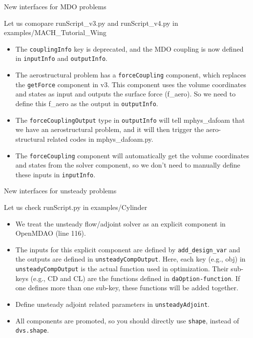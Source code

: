 \documentclass{bredelebeamer}
\begin{document}
\begin{frame}{New interfaces for MDO problems}

  Let us comopare runScript\_v3.py and runScript\_v4.py in examples/MACH\_Tutorial\_Wing
  
  \begin{itemize}
  
    \item The \texttt{couplingInfo} key is deprecated, and the MDO coupling is now defined in \texttt{inputInfo} and \texttt{outputInfo}.
    \item The aerostructural problem has a \texttt{forceCoupling} component, which replaces the \texttt{getForce} component in v3. This component uses the volume coordinates and states as input and outputs the surface force (f\_aero). So we need to define this f\_aero as the output in \texttt{outputInfo}. 
    \item The \texttt{forceCouplingOutput} type in \texttt{outputInfo} will tell mphys\_dafoam that we have an aerostructural problem, and it will then trigger the aero-structural related codes in mphys\_dafoam.py.
    \item The \texttt{forceCoupling} component will automatically get the volume coordinates and states from the solver component, so we don't need to manually define these inputs in \texttt{inputInfo}.
    
    
\end{itemize}
\end{frame}

\begin{frame}{New interfaces for unsteady problems}

   Let us check runScript.py in examples/Cylinder
  
  \begin{itemize}
  \item We treat the unsteady flow/adjoint solver as an explicit component in OpenMDAO (line 116).
  \item The inputs for this explicit component are defined by \texttt{add\_design\_var} and the outputs are defined in \texttt{unsteadyCompOutput}. Here, each key (e.g., obj) in \texttt{unsteadyCompOutput} is the actual function used in optimization. Their sub-keys (e.g., CD and CL) are the functions defined in \texttt{daOption-function}. If one defines more than one sub-key, these functions will be added together.  
   \item Define unsteady adjoint related parameters in \texttt{unsteadyAdjoint}.
   \item All components are promoted, so you should directly use \texttt{shape}, instead of \texttt{dvs.shape}.
   
    
    
\end{itemize}
\end{frame}
\end{document}
